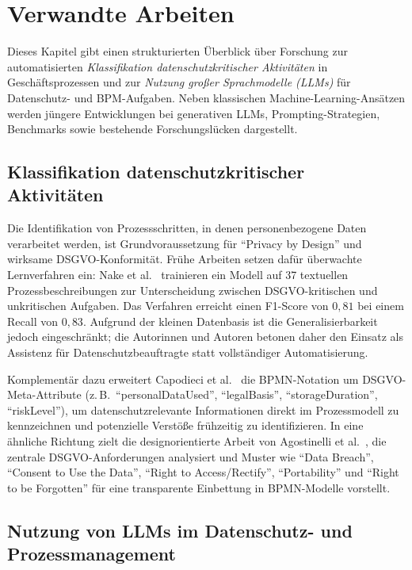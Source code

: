 \section{Verwandte Arbeiten}\label{sec:verwandte-arbeiten}

Dieses Kapitel gibt einen strukturierten Überblick über Forschung zur automatisierten \emph{Klassifikation datenschutzkritischer Aktivitäten} in Geschäftsprozessen und zur \emph{Nutzung großer Sprachmodelle (\acp{LLM})} für Datenschutz- und \ac{BPM}-Aufgaben. Neben klassischen Machine-Learning-Ansätzen werden jüngere Entwicklungen bei generativen \acp{LLM}, Prompting-Strategien, Benchmarks sowie bestehende Forschungslücken dargestellt.

\subsection*{Klassifikation datenschutzkritischer Aktivitäten}

Die Identifikation von Prozessschritten, in denen personenbezogene Daten verarbeitet werden, ist Grundvoraussetzung für \enquote{Privacy by Design} und wirksame \ac{DSGVO}-Konformität. Frühe Arbeiten setzen dafür überwachte Lernverfahren ein: Nake et al.\ \cite{nake2023towards} trainieren ein Modell auf 37 textuellen Prozessbeschreibungen zur Unterscheidung zwischen \ac{DSGVO}-kritischen und unkritischen Aufgaben. Das Verfahren erreicht einen F1-Score von $0{,}81$ bei einem Recall von $0{,}83$. Aufgrund der kleinen Datenbasis ist die Generalisierbarkeit jedoch eingeschränkt; die Autorinnen und Autoren betonen daher den Einsatz als Assistenz für Datenschutzbeauftragte statt vollständiger Automatisierung.

Komplementär dazu erweitert Capodieci et al.\ \cite{Capodieci2023BPMNEnabledDP} die \ac{BPMN}-Notation um \ac{DSGVO}-Meta-Attribute (z.\,B.\ \enquote{personalDataUsed}, \enquote{legalBasis}, \enquote{storageDuration}, \enquote{riskLevel}), um datenschutzrelevante Informationen direkt im Prozessmodell zu kennzeichnen und potenzielle Verstöße frühzeitig zu identifizieren. In eine ähnliche Richtung zielt die designorientierte Arbeit von Agostinelli et al.\ \cite{agostinelli2019achievingGDPRComliance}, die zentrale \ac{DSGVO}-Anforderungen analysiert und Muster wie \enquote{Data Breach}, \enquote{Consent to Use the Data}, \enquote{Right to Access/Rectify}, \enquote{Portability} und \enquote{Right to be Forgotten} für eine transparente Einbettung in \ac{BPMN}-Modelle vorstellt.

\subsection*{Nutzung von \acp{LLM} im Datenschutz- und Prozessmanagement}

